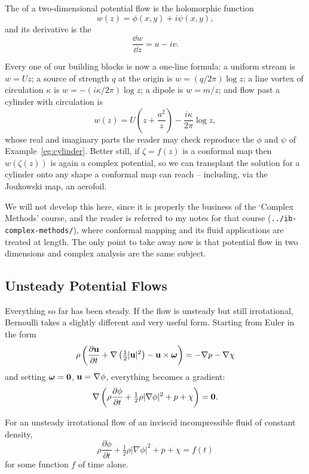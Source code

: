 \documentclass[a4paper]{scrartcl}
\newcommand{\pd}[2]{\frac{\partial #1}{\partial #2}}
\newcommand{\bom}{\boldsymbol{\omega}}
\begin{document}
\begin{definition}
	The  of a two-dimensional potential flow is the holomorphic function
	$$
	w(z) = \phi(x,y) + i \psi(x, y),
	$$
	and its derivative is the 
	$$
	\frac{\dd w}{\dd z} = u - iv.
	$$
\end{definition}

Every one of our building blocks is now a one-line formula: a uniform stream is $w = Uz$; a source of strength $q$ at the origin is $w = (q/2\pi)\log z$; a line vortex of circulation $\kappa$ is $w = -(i\kappa/2\pi)\log z$; a dipole is $w = m/z$; and flow past a cylinder with circulation is
$$
w(z) = U\left(z + \frac{a^2}{z}\right) - \frac{i\kappa}{2\pi}\log z,
$$
whose real and imaginary parts the reader may check reproduce the $\phi$ and $\psi$ of Example~\ref{eg:cylinder}. Better still, if $\zeta = f(z)$ is a conformal map then $w(\zeta(z))$ is again a complex potential, so we can transplant the solution for a cylinder onto any shape a conformal map can reach -- including, via the Joukowski map, an aerofoil.

We will not develop this here, since it is properly the business of the `Complex Methods' course, and the reader is referred to my notes for that course (\texttt{../ib-complex-methods/}), where conformal mapping and its fluid applications are treated at length. The only point to take away now is that potential flow in two dimensions and complex analysis are the same subject.

\subsection{Unsteady Potential Flows}

Everything so far has been steady. If the flow is unsteady but still irrotational, Bernoulli takes a slightly different and very useful form. Starting from Euler in the form
$$
\rho\left(\pd{\vv u}{t} + \nabla\left(\tfrac{1}{2}|\vv u|^2\right) - \vv u \times \bom\right) = -\nabla p - \nabla\chi
$$
and setting $\bom = \vv 0$, $\mathbf{u} = \nabla\phi$, everything becomes a gradient:
$$
\nabla\left(\rho\pd{\phi}{t} + \tfrac{1}{2}\rho|\nabla\phi|^2 + p + \chi\right) = \vv 0.
$$

\begin{proposition}
	For an unsteady irrotational flow of an inviscid incompressible fluid of constant density,
	$$
	\rho \pd{\phi}{t} + \tfrac{1}{2}\rho|\nabla\phi|^2 + p + \chi = f(t)
	$$
	for some function $f$ of time alone.
\end{proposition}
\end{document}
